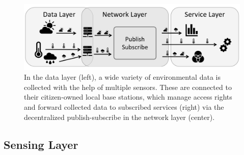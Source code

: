 \begin{figure}[h]
    \centering
    \includegraphics[width=\textwidth]{images/expose-system-architecture.png}
    \caption{In the data layer (left), a wide variety of environmental data is collected with the help of multiple sensors. These are connected to their citizen-owned local base stations, which manage access rights and forward collected data to subscribed services (right) via the decentralized publish-subscribe in the network layer (center).}
    \label{fig:system-architecture-overview}
\end{figure}

\subsection{Sensing Layer}

